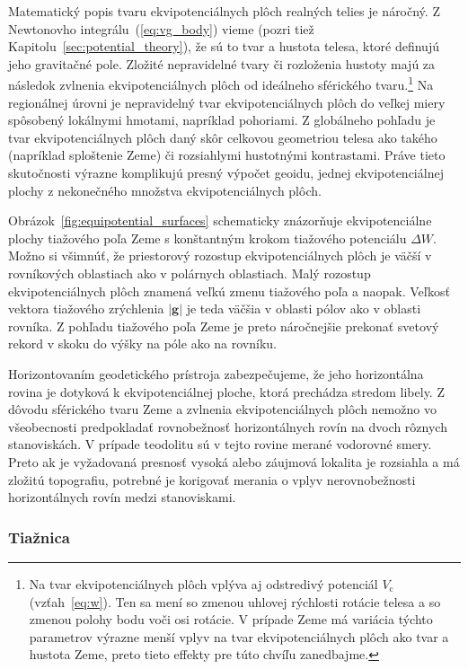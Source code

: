 \documentclass[a4paper, 12pt]{book}
\newcommand{\cidx}{\mathrm c}
\let\vec\mathbf
\begin{document}
Matematický popis tvaru ekvipotenciálnych plôch realných telies je náročný.  
Z Newtonovho integrálu~(\ref{eq:vg_body}) vieme (pozri tiež 
Kapitolu~\ref{sec:potential_theory}), že sú to tvar a hustota telesa, ktoré 
definujú jeho gravitačné pole.  Zložité nepravidelné tvary či rozloženia 
hustoty majú za následok zvlnenia ekvipotenciálnych plôch od ideálneho 
sférického tvaru.\footnote{Na tvar ekvipotenciálnych plôch vplýva aj odstredivý 
potenciál $V_\cidx$ (vzťah~\ref{eq:w}).  Ten sa mení so zmenou uhlovej 
rýchlosti rotácie telesa a so zmenou polohy bodu voči osi rotácie.  V prípade 
Zeme má variácia týchto parametrov výrazne menší vplyv na tvar 
ekvipotenciálnych plôch ako tvar a hustota Zeme, preto tieto effekty pre túto 
chvíľu zanedbajme.}  Na regionálnej úrovni je nepravidelný tvar 
ekvipotenciálnych plôch do veľkej miery spôsobený lokálnymi hmotami, napríklad 
pohoriami.  Z globálneho pohľadu je tvar ekvipotenciálnych plôch daný skôr 
celkovou geometriou telesa ako takého (napríklad sploštenie Zeme) či 
rozsiahlymi hustotnými kontrastami.  Práve tieto skutočnosti výrazne komplikujú 
presný výpočet geoidu, jednej ekvipotenciálnej plochy z nekonečného množstva 
ekvipotenciálnych plôch.

Obrázok~\ref{fig:equipotential_surfaces} schematicky znázorňuje ekvipotenciálne 
plochy tiažového poľa Zeme s konštantným krokom tiažového potenciálu $\Delta 
W$.  Možno si všimnúť, že priestorový rozostup ekvipotenciálnych plôch je väčší 
v rovníkových oblastiach ako v polárnych oblastiach.  Malý rozostup 
ekvipotenciálnych plôch znamená veľkú zmenu tiažového poľa a naopak.  Veľkosť 
vektora tiažového zrýchlenia $| \vec g |$ je teda väčšia v oblasti pólov ako 
v oblasti rovníka.  Z pohľadu tiažového poľa Zeme je preto náročnejšie prekonať 
svetový rekord v skoku do výšky na póle ako na rovníku.

Horizontovaním geodetického prístroja zabezpečujeme, že jeho horizontálna 
rovina je dotyková k ekvipotenciálnej ploche, ktorá prechádza stredom libely.  
Z dôvodu sférického tvaru Zeme a zvlnenia ekvipotenciálnych plôch nemožno vo 
všeobecnosti predpokladať rovnobežnosť horizontálnych rovín na dvoch rôznych 
stanoviskách.  V prípade teodolitu sú v tejto rovine merané vodorovné smery.  
Preto ak je vyžadovaná presnosť vysoká alebo záujmová lokalita je rozsiahla 
a má zložitú topografiu, potrebné je korigovať merania o vplyv nerovnobežnosti 
horizontálnych rovín medzi stanoviskami.

\subsubsection{Tiažnica}
\end{document}
